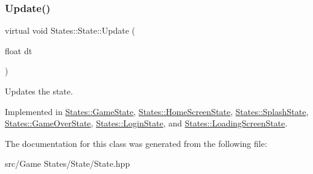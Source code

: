 \subsubsection{\texorpdfstring{Update()}{Update()}}
{\footnotesize\ttfamily virtual void States\+::\+State\+::\+Update (\begin{DoxyParamCaption}\item[{float}]{dt }\end{DoxyParamCaption})\hspace{0.3cm}{\ttfamily [pure virtual]}}



Updates the state. 

\begin{DoxyVerb}\end{DoxyVerb}
 

Implemented in \mbox{\hyperlink{class_states_1_1_game_state_aceb987110e6ec94c3d6bf6f095b170cd}{States\+::\+Game\+State}}, \mbox{\hyperlink{class_states_1_1_home_screen_state_a86c27b5c969563bb2d606cdecba1e949}{States\+::\+Home\+Screen\+State}}, \mbox{\hyperlink{class_states_1_1_splash_state_acf5f51ee32ca2a1634ce56dca901cad9}{States\+::\+Splash\+State}}, \mbox{\hyperlink{class_states_1_1_game_over_state_a8efab9044baa73dbe979b6da0aa9a041}{States\+::\+Game\+Over\+State}}, \mbox{\hyperlink{class_states_1_1_login_state_a026b040b86a5f4f0c3855fb5d5aef0ce}{States\+::\+Login\+State}}, and \mbox{\hyperlink{class_states_1_1_loading_screen_state_aff3b4dab779277f43cca4b4409f59a35}{States\+::\+Loading\+Screen\+State}}.



The documentation for this class was generated from the following file\+:\begin{DoxyCompactItemize}
\item 
src/\+Game States/\+State/State.\+hpp\end{DoxyCompactItemize}
